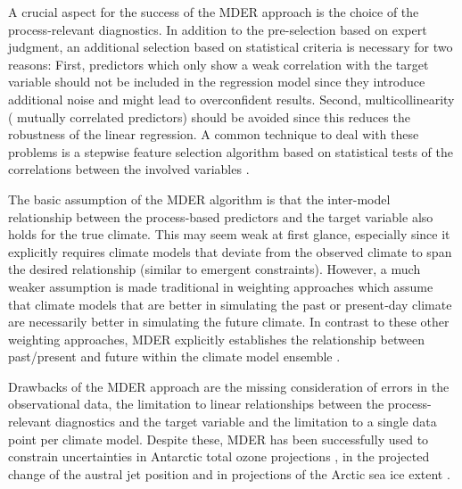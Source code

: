 A crucial aspect for the success of the \ac{MDER} approach is the choice of the
process-relevant diagnostics. In addition to the pre-selection based on expert
judgment, an additional selection based on statistical criteria is necessary
for two reasons: First, predictors which only show a weak correlation with the
target variable should not be included in the regression model since they
introduce additional noise and might lead to overconfident results. Second,
multicollinearity (\ie{} mutually correlated predictors) should be avoided
since this reduces the robustness of the linear regression. A common technique
to deal with these problems is a stepwise feature selection algorithm based on
statistical tests of the correlations between the involved variables
\autocite{Karpechko2013}.

The basic assumption of the \ac{MDER} algorithm is that the inter-model
relationship between the process-based predictors and the target variable also
holds for the true climate. This may seem weak at first glance, especially
since it explicitly requires climate models that deviate from the observed
climate to span the desired relationship (similar to emergent constraints).
However, a much weaker assumption is made traditional in weighting approaches
which assume that climate models that are better in simulating the past or
present‐day climate are necessarily better in simulating the future climate. In
contrast to these other weighting approaches, \ac{MDER} explicitly establishes
the relationship between past/present and future within the climate model
ensemble \autocite{Karpechko2013}.

Drawbacks of the \ac{MDER} approach are the missing consideration of errors in
the observational data, the limitation to linear relationships between the
process-relevant diagnostics and the target variable and the limitation to a
single data point per climate model. Despite these, \ac{MDER} has been
successfully used to constrain uncertainties in Antarctic total ozone
projections \autocite{Karpechko2013}, in the projected change of the austral
jet position \autocite{Wenzel2016a} and in projections of the Arctic sea ice
extent \autocite{Senftleben2020}.
